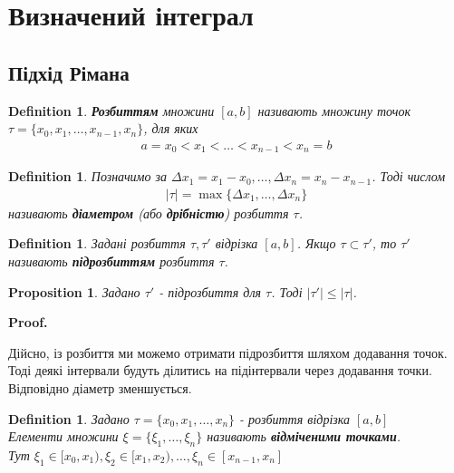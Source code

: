 \documentclass[a4paper, 10pt]{article}
\makeatletter
\def\qed{$\blacksquare$}
\theoremstyle{theoremdd}
\theoremstyle{theoremdd}
\newtheorem{definition}[theorem]{Definition}
\theoremstyle{theoremdd}
\theoremstyle{theoremdd}
\theoremstyle{theoremdd}
\newtheorem{proposition}[theorem]{Proposition}
\theoremstyle{theoremdd}
\theoremstyle{theoremdd}
\theoremstyle{theoremdd}
\renewenvironment{proof}[1][Proof.\\]{\par
\pushQED{\hfill \qed}%
\normalfont \topsep6\p@\@plus6\p@\relax
\trivlist
\item\relax
{\bfseries
#1\@addpunct{.}}\hspace\labelsep\ignorespaces
}{%
\popQED\endtrivlist\@endpefalse
}
\makeatother
\begin{document}
\iffalse
\section{Визначений інтеграл}
\subsection{Підхід Рімана}
\begin{definition}
\textbf{Розбиттям} множини $[a,b]$ називають множину точок $\tau = \{x_0,x_1,\dots,x_{n-1},x_n\}$, для яких
\begin{align*}
a = x_0 < x_1 < \dots < x_{n-1} < x_{n} = b
\end{align*}
\end{definition}

\begin{definition}
Позначимо за $\Delta x_1 = x_1 - x_0, \dots, \Delta x_n = x_{n} - x_{n-1}$. Тоді числом
\begin{align*}
|\tau| = \max\{\Delta x_1,\dots, \Delta x_n\}
\end{align*}
називають \textbf{діаметром} (або \textbf{дрібністю}) розбиття $\tau$.
\end{definition}

\begin{definition}
Задані розбиття $\tau, \tau'$ відрізка $[a,b]$. Якщо $\tau \subset \tau'$, то $\tau'$ називають \textbf{підрозбиттям} розбиття $\tau$.
\end{definition}

\begin{proposition}
Задано $\tau'$ - підрозбиття для $\tau$. Тоді $|\tau'| \leq |\tau|$.
\end{proposition}

\begin{proof}
Дійсно, із розбиття ми можемо отримати підрозбиття шляхом додавання точок. Тоді деякі інтервали будуть ділитись на підінтервали через додавання точки. Відповідно діаметр зменшується.
\end{proof}

\begin{definition}
Задано $\tau = \{x_0,x_1,\dots,x_n\}$ - розбиття відрізка $[a,b]$\\
Елементи множини $\xi = \{\xi_1, \dots, \xi_n \}$ називають \textbf{відміченими точками}.\\
Тут $\xi_1 \in [x_0,x_1), \xi_2 \in [x_1,x_2), \dots, \xi_n \in [x_{n-1}, x_n]$
\end{definition}
\end{document}
